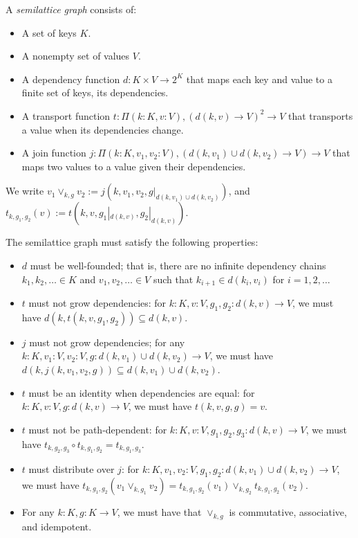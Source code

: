 \documentclass{article}
\begin{document}
        A \emph{semilattice graph} consists of:

        \begin{itemize}
            \item A set of keys $K$.
            \item A nonempty set of values $V$.
            \item A dependency function $d : K \times V \rightarrow 2^K$ that maps each key and value to a finite set of keys, its dependencies.
            \item A transport function $t : \Pi (k : K, v : V), (d(k, v) \rightarrow V)^2 \rightarrow V$ that transports a value when its dependencies change.
            \item A join function $j : \Pi (k : K, v_1, v_2 : V), (d(k, v_1) \cup d(k, v_2) \rightarrow V) \rightarrow V$ that maps two values to a value given their dependencies.
        \end{itemize}

        We write $v_1 \vee_{k, g} v_2 := j(k, v_1, v_2, g|_{d(k, v_1) \cup d(k, v_2)})$, and $t_{k, g_1, g_2}(v) := t(k, v, g_1|_{d(k, v)}, g_2|_{d(k, v)})$.

        The semilattice graph must satisfy the following properties:

        \begin{itemize}
            \item $d$ must be well-founded; that is, there are no infinite dependency chains $k_1, k_2, \ldots \in K$ and $v_1, v_2, \ldots \in V$ such that $k_{i+1} \in d(k_i, v_i)$ for $i = 1, 2, \ldots$
            \item $t$ must not grow dependencies: for $k : K, v : V, g_1, g_2 : d(k, v) \rightarrow V$, we must have $d(k, t(k, v, g_1, g_2)) \subseteq d(k, v)$.
            \item $j$ must not grow dependencies; for any $k : K, v_1 : V, v_2: V, g: d(k, v_1) \cup d(k, v_2) \rightarrow V$, we must have $d(k, j(k, v_1, v_2, g)) \subseteq d(k, v_1) \cup d(k, v_2)$.
            \item $t$ must be an identity when dependencies are equal: for $k : K, v : V, g : d(k, v) \rightarrow V$, we must have $t(k, v, g, g) = v$.
            \item $t$ must not be path-dependent: for $k : K, v : V, g_1, g_2, g_3: d(k, v) \rightarrow V$, we must have $t_{k, g_2, g_3} \circ t_{k, g_1, g_2} = t_{k, g_1, g_3}$.
            \item $t$ must distribute over $j$: for $k : K, v_1, v_2 : V, g_1, g_2 : d(k, v_1) \cup d(k, v_2) \rightarrow V$, we must have $t_{k, g_1, g_2}(v_1 \vee_{k, g_1} v_2) = t_{k, g_1, g_2}(v_1) \vee_{k, g_2} t_{k, g_1, g_2}(v_2)$.
            \item For any $k: K, g : K \rightarrow V$, we must have that $\vee_{k, g}$ is commutative, associative, and idempotent.
        \end{itemize}
\end{document}
